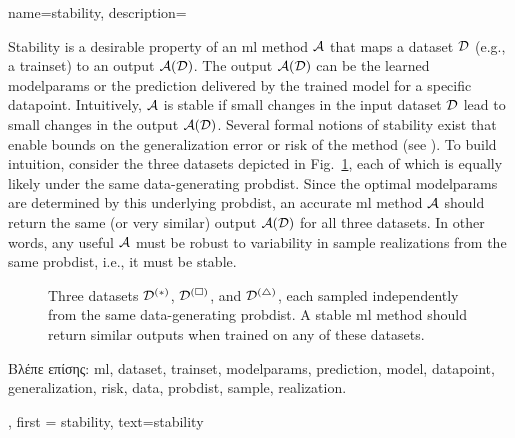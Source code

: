 {name={stability},
	description={
		Stability is a desirable property of an \gls{ml} method $\mathcal{A}$ that maps a 
		\gls{dataset} $\mathcal{D}$ (e.g., a \gls{trainset}) to an output $\mathcal{A}(\mathcal{D})$. The output 
		$\mathcal{A}(\mathcal{D})$ can be the learned \gls{modelparams} or the \gls{prediction} delivered 
		by the trained \gls{model} for a specific \gls{datapoint}. Intuitively, $\mathcal{A}$ is 
		stable if small changes in the input \gls{dataset} $\mathcal{D}$ lead to small changes in the 
		output $\mathcal{A}(\mathcal{D})$. Several formal notions of stability exist that enable bounds 
		on the \gls{generalization} error or \gls{risk} of the method (see \cite[Ch.~13]{ShalevMLBook}).
		To build intuition, consider the three \gls{dataset}s depicted in Fig.~\ref{fig_three_data_stability}, each 
		of which is equally likely under the same \gls{data}-generating \gls{probdist}. Since the 
		optimal \gls{modelparams} are determined by this underlying \gls{probdist}, an accurate 
		\gls{ml} method $\mathcal{A}$ should return the same (or very similar) output $\mathcal{A}(\mathcal{D})$ 
		for all three \gls{dataset}s. In other words, any useful $\mathcal{A}$ must be robust to 
		variability in \gls{sample} \gls{realization}s from the same \gls{probdist}, i.e., it must be stable. 
		\begin{figure}[H]
			\centering
			\caption{Three \gls{dataset}s $\mathcal{D}^{(*)}$, $\mathcal{D}^{(\square)}$, and $\mathcal{D}^{(\triangle)}$, 
				each sampled independently from the same \gls{data}-generating \gls{probdist}. A stable \gls{ml} 
				method should return similar outputs when trained on any of these \gls{dataset}s. \label{fig_three_data_stability}}
		\end{figure}
		\foreignlanguage{greek}{Βλέπε επίσης:} \gls{ml}, \gls{dataset}, \gls{trainset}, \gls{modelparams}, \gls{prediction}, \gls{model}, \gls{datapoint}, \gls{generalization}, \gls{risk}, \gls{data}, \gls{probdist}, \gls{sample}, \gls{realization}.
		}, 
	first = {stability}, text={stability} 
}


